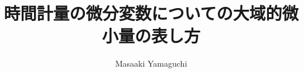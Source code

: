 \documentclass{jsarticle}
\begin{document}
\title{時間計量の微分変数についての大域的微小量の表し方}
\author{Masaaki Yamaguchi}
\date{}
\maketitle
\newcommand{\timebow}{%
	\begin{picture}(5,5)
		\put(0,0){$\text{\rotatebox{90}{$\bowtie$}}$}
	\end{picture} %
	}
   \newcommand{\variint}{%
	\begin{picture}(15,30)
		\put(0,0){
			$ \iint $}
		\put(0,5){\line(15,0){15}}
	\end{picture} %
}

\newcommand{\variiint}{%
	\begin{picture}(15,15)
		\put(0,0){
			$ \iiint $}
		\put(0,5){\line(15,0){20}}
	\end{picture} %
}



 \newcommand{\alearletter}{%
	 \begin{picture}(10,20)
		 \put(0,0){
			 $ \square $}
		 \put(0,0){\line(1,1){10}}
	 \end{picture} %
	 }
\end{document}
